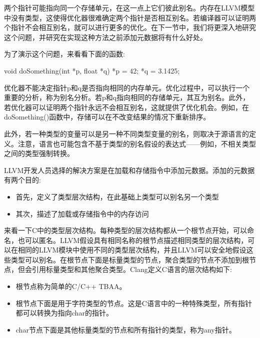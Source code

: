 
两个指针可能指向同一个存储单元，在这一点上它们彼此别名。内存在LLVM模型中没有类型，这使得优化器很难确定两个指针是否相互别名。若编译器可以证明两个指针不会相互别名，就可以进行更多的优化。在下一节中，我们将更深入地研究这个问题，并研究在实现这种方法之前添加元数据将有什么好处。


为了演示这个问题，来看看下面的函数:

\begin{cpp}
void doSomething(int *p, float *q) {
    *p = 42;
    *q = 3.1425;
}
\end{cpp}

优化器不能决定指针p和q是否指向相同的内存单元。优化过程中，可以执行一个重要的分析，称为别名分析。若p和q指向相同的存储单元，其互为别名。此外，若优化器可以证明两个指针永远不会相互别名，这就提供了优化机会。例如，在doSomething()函数中，存储可以在不改变结果的情况下重新排序。

此外，若一种类型的变量可以是另一种不同类型变量的别名，则取决于源语言的定义。注意，语言也可能包含不基于类型的别名假设的表达式——例如，不相关类型之间的类型强制转换。

LLVM开发人员选择的解决方案是在加载和存储指令中添加元数据。添加的元数据有两个目的:

\begin{itemize}
\item
首先，定义了类型层次结构，在此基础上类型可以别名另一个类型

\item
其次，描述了加载或存储指令中的内存访问
\end{itemize}

来看一下C中的类型层次结构。每种类型的层次结构都从一个根节点开始，可以命名，也可以匿名。LLVM假设具有相同名称的根节点描述相同类型的层次结构，可以在相同的LLVM模块中使用不同的类型层次结构，并且LLVM可以安全地假设这些类型可以别名。在根节点下面是标量类型的节点，聚合类型的节点不添加到根节点，但会引用标量类型和其他聚合类型。Clang定义C语言的层次结构如下:

\begin{itemize}
\item
根节点称为简单的C/C++ TBAA。

\item
根节点下面是用于字符类型的节点。这是C语言中的一种特殊类型，所有指针都可以转换为指向char的指针。

\item
char节点下面是其他标量类型的节点和所有指针的类型，称为any指针。
\end{itemize}

